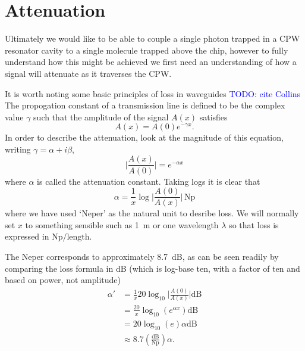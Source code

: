 \documentclass[a4paper]{article}
\newcommand{\cm}[1]{\textcolor{blue}{#1}} %
\begin{document}


\section{Attenuation}

Ultimately we would like to be able to couple a single photon trapped in a CPW
resonator cavity to a single molecule trapped above the chip, however to fully
understand how this might be achieved we first need an understanding of how a
signal will attenuate as it traverses the CPW.

It is worth noting some basic principles of loss in waveguides \cm{TODO: cite
Collins}
The propogation constant of a transmission line is defined to be the complex
value $\gamma$ such that the amplitude of the signal $A(x)$ satisfies
\begin{equation}
  A(x) = A(0)e^{-\gamma x}.
\end{equation}
In order to describe the attenuation, look at the magnitude of this equation,
writing $\gamma = \alpha +i\beta$,
\begin{equation}
  \lvert\frac{A(x)}{A(0)}\rvert = e^{-\alpha x}
\end{equation}
where $\alpha$ is called the attenuation constant. Taking logs it is clear that
\begin{equation}
  \alpha = \frac{1}{x}\log\lvert\frac{A(0)}{A(x)}\rvert\,\si{\neper}
\end{equation}
where we have used `Neper' as the natural unit to desribe loss. We will normally
set $x$ to something sensible such as \SI{1}{\meter} or one wavelength $\lambda$
so that loss is expressed in $\si{\neper}/\mathrm{length}$.

The Neper corresponds to approximately \SI{8.7}{\dB}, as can be seen readily by
comparing the loss formula in dB (which is log-base ten, with a factor of ten
and based on power, not amplitude)
\begin{align*}
  \alpha' &= \frac{1}{x}20\log_{10}\lvert \frac{A(0)}{A(x)} \rvert \si{\dB}\\
          &= \frac{20}{x}\log_{10}(e^{\alpha x}) \si{\dB} \\
          &= 20 \log_{10}(e) \alpha \si{\dB} \\
          &\approx 8.7 \left(\frac{\si{\dB}}{\si{\neper}}\right) \alpha.
\end{align*}
\end{document}
